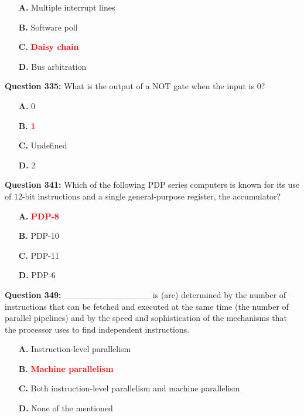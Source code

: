 \documentclass[12pt,a4paper]{article}
\begin{document}
\begin{itemize}
    \item[\textbf{A.}] Multiple interrupt lines
    \item[\textbf{B.}] Software poll
    \item[\textbf{C.}] \textcolor{red}{\textbf{Daisy chain}}
    \item[\textbf{D.}] Bus arbitration
\end{itemize}

\vspace{0.5cm}

\textbf{Question 335:} What is the output of a NOT gate when the input is 0?

\begin{itemize}
    \item[\textbf{A.}] 0
    \item[\textbf{B.}] \textcolor{red}{\textbf{1}}
    \item[\textbf{C.}] Undefined
    \item[\textbf{D.}] 2
\end{itemize}

\vspace{0.5cm}

\textbf{Question 341:} Which of the following PDP series computers is known for its use of 12-bit instructions and a single general-purpose register, the accumulator?

\begin{itemize}
    \item[\textbf{A.}] \textcolor{red}{\textbf{PDP-8}}
    \item[\textbf{B.}] PDP-10
    \item[\textbf{C.}] PDP-11
    \item[\textbf{D.}] PDP-6
\end{itemize}

\vspace{0.5cm}

\textbf{Question 349:} ______________ is (are) determined by the number of instructions that can be fetched and executed at the same time (the number of parallel pipelines) and by the speed and sophistication of the mechanisms that the processor uses to find independent instructions.

\begin{itemize}
    \item[\textbf{A.}] Instruction-level parallelism
    \item[\textbf{B.}] \textcolor{red}{\textbf{Machine parallelism}}
    \item[\textbf{C.}] Both instruction-level parallelism and machine parallelism
    \item[\textbf{D.}] None of the mentioned
\end{itemize}
\end{document}
